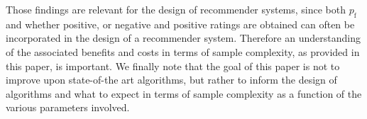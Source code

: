 \documentclass{article}
\newcommand\pf{p_{\mathrm{f}}}
\begin{document}
Those findings are relevant for the design of recommender systems, 
since both $\pf$ and whether positive, or negative and positive ratings are obtained can often be incorporated in the design of a recommender system. 
Therefore an understanding of the associated benefits and costs in terms of sample complexity, as provided in this paper, is important. 
We finally note that the goal of this paper is not to improve upon state-of-the art algorithms, but rather to %
inform the design of algorithms and what to expect in terms of sample complexity as a function of the various parameters involved. 





 

\vspace{-0.2cm}
\end{document}
